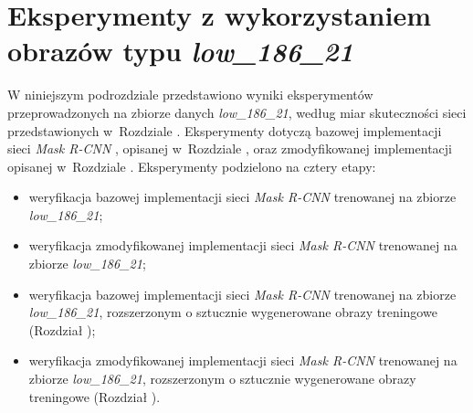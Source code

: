 \section{Eksperymenty z wykorzystaniem obrazów typu \textit{low\_186\_21}}
\label{sec:experymenty_low}
W niniejszym podrozdziale przedstawiono wyniki eksperymentów przeprowadzonych na zbiorze danych \textit{low\_186\_21}, według miar skuteczności sieci przedstawionych w~Rozdziale .
Eksperymenty dotyczą bazowej implementacji sieci \textit{Mask R-CNN} \cite{matterport-mask-rcnn}, opisanej w~Rozdziale , oraz zmodyfikowanej implementacji opisanej w~Rozdziale .
Eksperymenty podzielono na cztery etapy:

\begin{itemize}
 \item weryfikacja bazowej implementacji sieci \textit{Mask R-CNN} trenowanej na zbiorze \textit{low\_186\_21};
 \item weryfikacja zmodyfikowanej implementacji sieci \textit{Mask R-CNN} trenowanej na zbiorze \textit{low\_186\_21};
 \item weryfikacja bazowej implementacji sieci \textit{Mask R-CNN} trenowanej na zbiorze \textit{low\_186\_21}, rozszerzonym o sztucznie wygenerowane obrazy treningowe (Rozdział );
 \item weryfikacja zmodyfikowanej implementacji sieci \textit{Mask R-CNN} trenowanej na zbiorze \textit{low\_186\_21}, rozszerzonym o sztucznie wygenerowane obrazy treningowe (Rozdział ).
\end{itemize}
